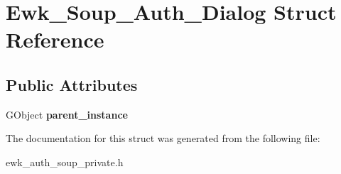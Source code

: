 \hypertarget{structEwk__Soup__Auth__Dialog}{\section{Ewk\+\_\+\+Soup\+\_\+\+Auth\+\_\+\+Dialog Struct Reference}
\label{structEwk__Soup__Auth__Dialog}
}
\subsection*{Public Attributes}
\begin{DoxyCompactItemize}
\item 
\hypertarget{structEwk__Soup__Auth__Dialog_aa4063f0e6e679c4391009bff501f798d}{G\+Object {\bfseries parent\+\_\+instance}}\label{structEwk__Soup__Auth__Dialog_aa4063f0e6e679c4391009bff501f798d}

\end{DoxyCompactItemize}


The documentation for this struct was generated from the following file\+:\begin{DoxyCompactItemize}
\item 
ewk\+\_\+auth\+\_\+soup\+\_\+private.\+h\end{DoxyCompactItemize}
